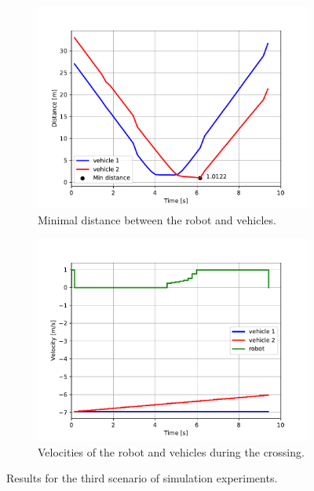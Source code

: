             \begin{figure}[H]
                \centering
                \begin{subfigure}{0.49\linewidth}
                    \centering
                    \includegraphics[trim={24 8 40 41}, clip, width=\linewidth]{images/simulations/scene3_dist.pdf}
                    \caption{Minimal distance between the robot and vehicles.}
                    \label{fig:scene3_graph1}
                \end{subfigure}
                \begin{subfigure}{0.49\linewidth}
                    \centering
                    \includegraphics[trim={21 8 40 41}, clip, width=\linewidth]{images/simulations/scene3_vel.pdf}
                    \caption{Velocities of the robot and vehicles during the crossing.}
                    \label{fig:scene3_graph2}
                \end{subfigure}
                \caption{Results for the third scenario of simulation experiments.}
                \label{fig:scene3_graphs}
            \end{figure}
